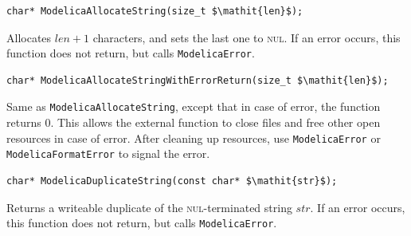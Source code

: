 \begin{functiondefinition}[ModelicaAllocateString]
\begin{synopsis}[C]\begin{lstlisting}
char* ModelicaAllocateString(size_t $\mathit{len}$);
\end{lstlisting}\end{synopsis}
\begin{semantics}
Allocates $\mathit{len}+1$ characters, and sets the last one to \textsc{nul}.
If an error occurs, this function does not return, but calls {\lstinline[language=C]!ModelicaError!}.
\end{semantics}
\end{functiondefinition}

\begin{functiondefinition}[ModelicaAllocateStringWithErrorReturn]
\begin{synopsis}[C]\begin{lstlisting}
char* ModelicaAllocateStringWithErrorReturn(size_t $\mathit{len}$);
\end{lstlisting}\end{synopsis}
\begin{semantics}
Same as {\lstinline[language=C]!ModelicaAllocateString!}, except that in case of error, the function returns 0.
This allows the external function to close files and free other open resources in case of error.
After cleaning up resources, use {\lstinline[language=C]!ModelicaError!} or {\lstinline[language=C]!ModelicaFormatError!} to signal the error.
\end{semantics}
\end{functiondefinition}

\begin{functiondefinition}[ModelicaDuplicateString]
\begin{synopsis}[C]\begin{lstlisting}
char* ModelicaDuplicateString(const char* $\mathit{str}$);
\end{lstlisting}\end{synopsis}
\begin{semantics}
Returns a writeable duplicate of the \textsc{nul}-terminated string $\mathit{str}$.
If an error occurs, this function does not return, but calls {\lstinline[language=C]!ModelicaError!}.
\end{semantics}
\end{functiondefinition}

